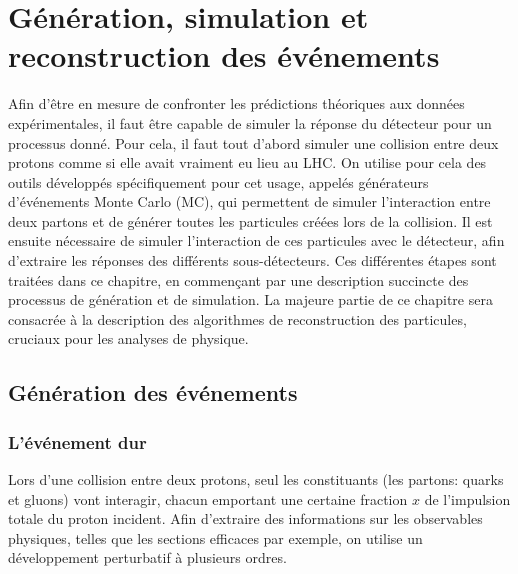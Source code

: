 \chapter{Génération, simulation et reconstruction des événements} \label{chap:reco}

Afin d'être en mesure de confronter les prédictions théoriques aux données expérimentales, il faut être capable de simuler la réponse du détecteur pour un processus donné. Pour cela, il faut tout d'abord simuler une collision entre deux protons comme si elle avait vraiment eu lieu au LHC. On utilise pour cela des outils développés spécifiquement pour cet usage, appelés générateurs d'événements Monte Carlo (MC), qui permettent de simuler l'interaction entre deux partons et de générer toutes les particules créées lors de la collision. Il est ensuite nécessaire de simuler l'interaction de ces particules avec le détecteur, afin d'extraire les réponses des différents sous-détecteurs. Ces différentes étapes sont traitées dans ce chapitre, en commençant par une description succincte des processus de génération et de simulation. La majeure partie de ce chapitre sera consacrée à la description des algorithmes de reconstruction des particules, cruciaux pour les analyses de physique.

\section{Génération des événements}



\subsection{L'événement dur}

Lors d'une collision entre deux protons, seul les constituants (les partons: quarks et gluons) vont interagir, chacun emportant une certaine fraction $x$ de l'impulsion totale du proton incident. Afin d'extraire des informations sur les observables physiques, telles que les sections efficaces par exemple, on utilise un développement perturbatif à plusieurs ordres.

